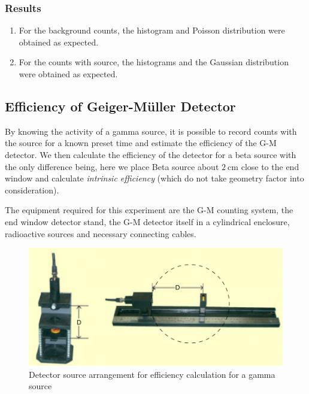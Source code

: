 \documentclass[%
 reprint,
nofootinbib,
 amsmath,amssymb,
 aps,
floatfix,
]{revtex4-2}
\begin{document}
        \subsubsection{Results}
        \begin{enumerate}
            \item For the background counts, the histogram and Poisson distribution were obtained as expected.
            \item For the counts with source, the histograms and the Gaussian distribution were obtained as expected.
        \end{enumerate}


    \subsection{Efficiency of Geiger-M\"{u}ller Detector}
        By knowing the activity of a gamma source, it is possible to record counts with the source for a known preset time and estimate the efficiency of the G-M detector. We then calculate the efficiency of the detector for a beta source with the only difference being, here we place Beta source about $\SI{2}{\centi \metre}$ close to the end window and calculate \textit{intrinsic efficiency} (which do not take geometry factor into consideration).
        \par
        The equipment required for this experiment are the G-M counting system, the end window detector stand, the G-M detector itself in a cylindrical enclosure, radioactive sources and necessary connecting cables.
        \begin{figure}
            \centering
            \includegraphics[scale = 0.8]{Figures/gmeff.png}
            \caption{Detector source arrangement for efficiency calculation for a gamma source}
            \label{fig:gmeff}
        \end{figure}
\end{document}
